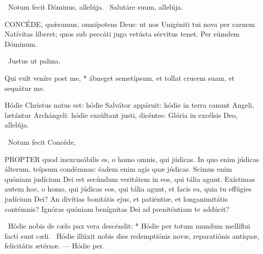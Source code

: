 \V\ Notum fecit Dóminus, allelúja. \R\ Salutáre suum, allelúja.


\lettrine[lines=2]{C}{ONCÉDE}, quǽsumus, omnípotens Deus: ut nos Unigéniti tui nova per carnem Natívitas líberet; quos sub peccáti jugo vetústa sérvitus tenet. Per eúmdem Dóminum.


\V\ Justus ut palma.

 Qui vult veníre post me, * ábneget semetípsum, et tollat crucem suam, et sequátur me.


\sectionornament





 Hódie Christus natus est: hódie Salvátor appáruit: hódie in terra canunt Angeli, lætántur Archángeli: hódie exsúltant justi, dicéntes: Glória in excélsis Deo, allelúja.

\V\ Notum fecit  Concéde, 




\lettrine[lines=2]{P}{ROPTER} quod inexcusábilis es, o homo omnis, qui júdicas. In quo enim júdicas álterum, teípsum condémnas: éadem enim agis quæ júdicas. Scimus enim quóniam judícium Dei est secúndum veritátem in eos, qui tália agunt. Exístimas autem hoc, o homo, qui júdicas eos, qui tália agunt, et facis ea, quia tu effúgies judícium Dei? An divítias bonitátis ejus, et patiéntiæ, et longanimitátis contémnis? Ignóras quóniam benígnitas Dei ad pœniténtiam te addúcit?

\R\ Hódie nobis de cælo pax vera descéndit: * Hódie per totum mundum mellíflui facti sunt cæli. \V\ Hódie illúxit nobis dies redemptiónis novæ, reparatiónis antíquæ, felicitátis ætérnæ. --- Hódie per.


